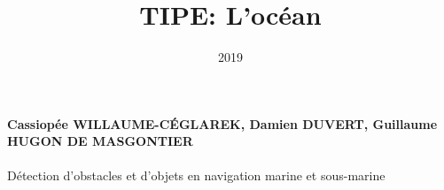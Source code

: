 \documentclass[a4paper,11pt]{article}
\title{TIPE: L'oc\'{e}an}
\date{2019}
\begin{document}
\maketitle
\paragraph{Cassiop\'{e}e WILLAUME-C\'{E}GLAREK, Damien DUVERT, Guillaume HUGON DE MASGONTIER \newline \newline\newline \newline\newline\newline \newline}
\begin{center}
\huge{D\'{e}tection d'obstacles et d'objets en navigation marine et sous-marine} \newpage
\end{center}
\end{document}
